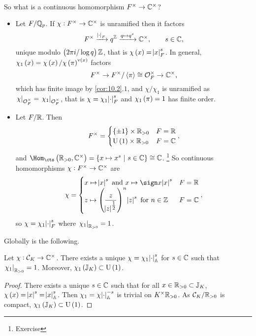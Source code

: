 So what is a continuous homomorphism $ F^\times \to \mathbb{C}^\times $?
\begin{itemize}
\item Let $ F / \mathbb{Q}_p $. If $ \chi : F^\times \to \mathbb{C}^\times $ is unramified then it factors
$$ F^\times \xrightarrow{\abs{\cdot}_F} q^{\mathbb{Z}} \xrightarrow{q \mapsto q^s} \mathbb{C}^\times, \qquad s \in \mathbb{C}, $$
unique modulo $ \br{2\pi i / \log q}\ZZ $, that is $ \chi\br{x} = \abs{x}_F^s $. In general, $ \chi_1\br{x} = \chi\br{x} / \chi\br{\pi}^{\v\br{x}} $ factors
$$ F^\times \to F^\times / \left\langle \pi \right\rangle \cong \mathcal{O}_F^\times \to \mathbb{C}^\times, $$
which has finite image by \ref{cor:10.2}.$ 1 $, and $ \chi / \chi_1 $ is unramified as $ \left. \chi \right|_{\mathcal{O}_F^\times} = \left. \chi_1 \right|_{\mathcal{O}_F^\times} $, that is $ \chi = \chi_1\abs{\cdot}_F^s $ and $ \chi_1\br{\pi} = 1 $ has finite order.
\item Let $ F / \mathbb{R} $. Then
$$ F^\times =
\begin{cases}
\cbr{\pm 1} \times \RR_{> 0} & F = \RR \\
\U\br{1} \times \RR_{> 0} & F = \CC
\end{cases},
$$
and $ \Hom_{\cts}\br{\RR_{> 0}, \CC^\times} = \cbr{x \mapsto x^s \st s \in \CC} \cong \CC $. \footnote{Exercise} So continuous homomorphisms $ \chi : F^\times \to \mathbb{C}^\times $ are
$$ \chi =
\begin{cases}
x \mapsto \abs{x}^s \ \text{and} \ x \mapsto \sign x\abs{x}^s & F = \RR \\
z \mapsto \br{\dfrac{z}{\abs{z}^{\tfrac{1}{2}}}}^n\abs{z}^s \ \text{for} \ n \in \ZZ & F = \CC
\end{cases},
$$
so $ \chi = \chi_1\abs{\cdot}_F^s $ where $ \left. \chi_1 \right|_{\mathbb{R}_{> 0}} = 1 $.
\end{itemize}
Globally is the following.

\begin{proposition}
Let $ \chi : \mathcal{C}_K \to \mathbb{C}^\times $. There exists a unique $ \chi = \chi_1\abs{\cdot}_{\mathbb{A}}^s $ for $ s \in \mathbb{C} $ such that $ \left. \chi_1 \right|_{\mathbb{R}_{> 0}} = 1 $. Moreover, $ \chi_1\br{\JJ_K} \subset \U\br{1} $.
\end{proposition}

\begin{proof}
There exists a unique $ s \in \mathbb{C} $ such that for all $ x \in \mathbb{R}_{> 0} \subset \mathbb{J}_K $, $ \chi\br{x} = \abs{x}^s = \abs{x}_\AA^s $. Then $ \chi_1 = \chi\abs{\cdot}_{\mathbb{A}}^{-s} $ is trivial on $ K^\times\mathbb{R}_{> 0} $. As $ \mathcal{C}_K / \mathbb{R}_{> 0} $ is compact, $ \chi_1\br{\JJ_K} \subset \U\br{1} $.
\end{proof}

